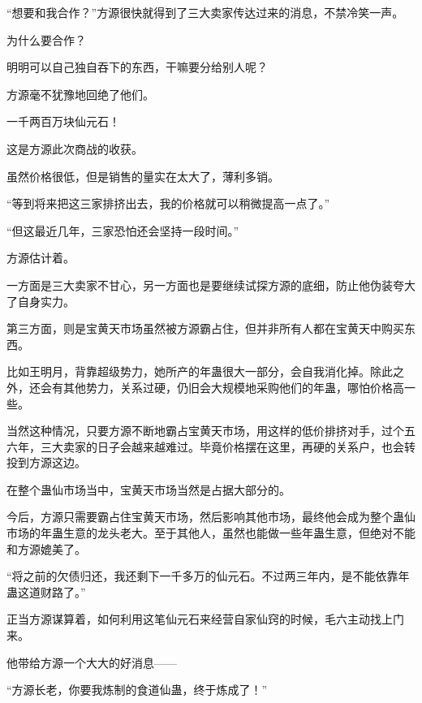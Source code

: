 \begin{this_body}
“想要和我合作？”方源很快就得到了三大卖家传达过来的消息，不禁冷笑一声。

为什么要合作？

明明可以自己独自吞下的东西，干嘛要分给别人呢？

方源毫不犹豫地回绝了他们。

一千两百万块仙元石！

这是方源此次商战的收获。

虽然价格很低，但是销售的量实在太大了，薄利多销。

“等到将来把这三家排挤出去，我的价格就可以稍微提高一点了。”

“但这最近几年，三家恐怕还会坚持一段时间。”

方源估计着。

一方面是三大卖家不甘心，另一方面也是要继续试探方源的底细，防止他伪装夸大了自身实力。

第三方面，则是宝黄天市场虽然被方源霸占住，但并非所有人都在宝黄天中购买东西。

比如王明月，背靠超级势力，她所产的年蛊很大一部分，会自我消化掉。除此之外，还会有其他势力，关系过硬，仍旧会大规模地采购他们的年蛊，哪怕价格高一些。

当然这种情况，只要方源不断地霸占宝黄天市场，用这样的低价排挤对手，过个五六年，三大卖家的日子会越来越难过。毕竟价格摆在这里，再硬的关系户，也会转投到方源这边。

在整个蛊仙市场当中，宝黄天市场当然是占据大部分的。

今后，方源只需要霸占住宝黄天市场，然后影响其他市场，最终他会成为整个蛊仙市场的年蛊生意的龙头老大。至于其他人，虽然也能做一些年蛊生意，但绝对不能和方源媲美了。

“将之前的欠债归还，我还剩下一千多万的仙元石。不过两三年内，是不能依靠年蛊这道财路了。”

正当方源谋算着，如何利用这笔仙元石来经营自家仙窍的时候，毛六主动找上门来。

他带给方源一个大大的好消息——

“方源长老，你要我炼制的食道仙蛊，终于炼成了！”

\end{this_body}


